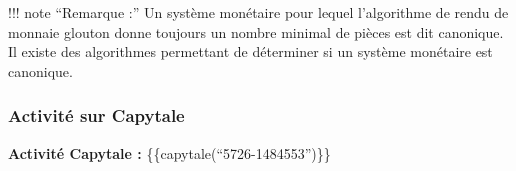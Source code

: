 !!! note ``Remarque :'' Un système monétaire pour lequel l'algorithme de
rendu de monnaie glouton donne toujours un nombre minimal de pièces est
dit canonique. Il existe des algorithmes permettant de déterminer si un
système monétaire est canonique.

\hypertarget{activituxe9-sur-capytale}{%
\subsubsection{Activité sur Capytale}\label{activituxe9-sur-capytale}}

\textbf{Activité Capytale :} \{\{capytale(``5726-1484553'')\}\}
